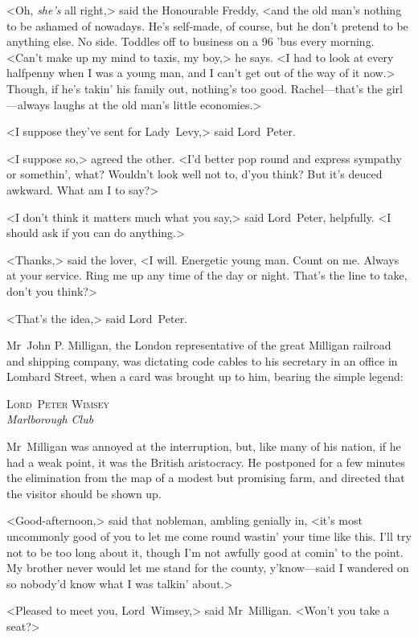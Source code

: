 <Oh, \textit{she's} all right,> said the Honourable Freddy, <and the old man's nothing to be ashamed of nowadays. He's self-made, of course, but he don't pretend to be anything else. No side. Toddles off to business on a 96 'bus every morning. <Can't make up my mind to taxis, my boy,> he says. <I had to look at every halfpenny when I was a young man, and I can't get out of the way of it now.> Though, if he's takin' his family out, nothing's too good. Rachel—that's the girl—always laughs at the old man's little economies.>

<I suppose they've sent for Lady~Levy,> said Lord~Peter.

<I suppose so,> agreed the other. <I'd better pop round and express sympathy or somethin', what? Wouldn't look well not to, d'you think? But it's deuced awkward. What am I to say?>

<I don't think it matters much what you say,> said Lord~Peter, helpfully. <I should ask if you can do anything.>

<Thanks,> said the lover, <I will. Energetic young man. Count on me. Always at your service. Ring me up any time of the day or night. That's the line to take, don't you think?>

<That's the idea,> said Lord~Peter.

Mr~John P\@. Milligan, the London representative of the great Milligan railroad and shipping company, was dictating code cables to his secretary in an office in Lombard Street, when a card was brought up to him, bearing the simple legend:

\begin{center}
\textsc{Lord~Peter Wimsey}\\
\textit{Marlborough Club}
\end{center}

Mr~Milligan was annoyed at the interruption, but, like many of his nation, if he had a weak point, it was the British aristocracy. He postponed for a few minutes the elimination from the map of a modest but promising farm, and directed that the visitor should be shown up.

<Good-afternoon,> said that nobleman, ambling genially in, <it's most uncommonly good of you to let me come round wastin' your time like this. I'll try not to be too long about it, though I'm not awfully good at comin' to the point. My brother never would let me stand for the county, y'know—said I wandered on so nobody'd know what I was talkin' about.>

<Pleased to meet you, Lord~Wimsey,> said Mr~Milligan. <Won't you take a seat?>

